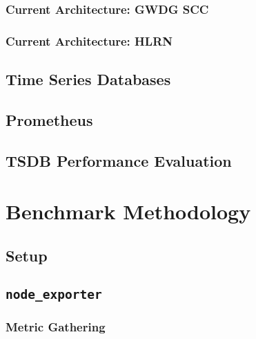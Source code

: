 \subsubsection{Current Architecture: GWDG SCC}
\subsubsection{Current Architecture: HLRN}
\subsection{Time Series Databases}
\subsection{Prometheus}
\subsection{TSDB Performance Evaluation}

\section{Benchmark Methodology}
\subsection{Setup}
\subsection{\texttt{node\_exporter}}
\subsubsection{Metric Gathering}
